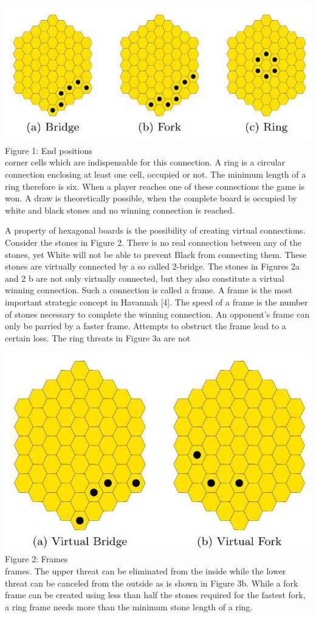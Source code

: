 \documentclass[10pt]{article}
\begin{document}
\includegraphics[max width=\textwidth, center]{2024_09_21_575efd6e0a8f951a52dfg-2}\\
Figure 1: End positions\\
corner cells which are indispensable for this connection. A ring is a circular connection enclosing at least one cell, occupied or not. The minimum length of a ring therefore is six. When a player reaches one of these connections the game is won. A draw is theoretically possible, when the complete board is occupied by white and black stones and no winning connection is reached.

A property of hexagonal boards is the possibility of creating virtual connections. Consider the stones in Figure 2. There is no real connection between any of the stones, yet White will not be able to prevent Black from connecting them. These stones are virtually connected by a so called 2-bridge. The stones in Figures 2a and 2 b are not only virtually connected, but they also constitute a virtual winning connection. Such a connection is called a frame. A frame is the most important strategic concept in Havannah [4]. The speed of a frame is the number of stones necessary to complete the winning connection. An opponent's frame can only be parried by a faster frame. Attempts to obstruct the frame lead to a certain loss. The ring threats in Figure 3a are not

\includegraphics[max width=\textwidth, center]{2024_09_21_575efd6e0a8f951a52dfg-2(1)}\\
Figure 2: Frames\\
frames. The upper threat can be eliminated from the inside while the lower threat can be canceled from the outside as is shown in Figure 3b. While a fork frame can be created using less than half the stones required for the fastest fork, a ring frame needs more than the minimum stone length of a ring.
\end{document}

